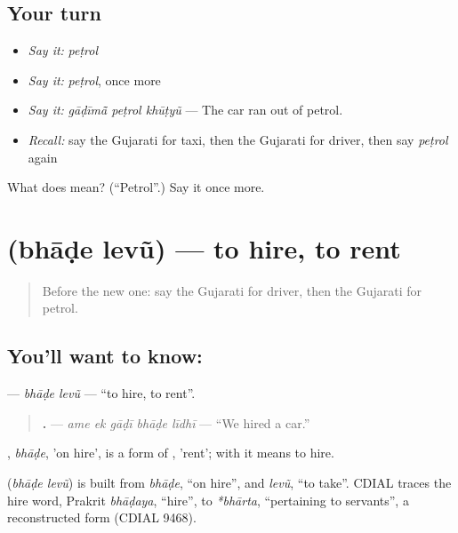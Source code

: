\subsection*{Your turn}
\begin{itemize}
\raggedright
  \item \emph{Say it:} \emph{peṭrol}
  \item \emph{Say it:} \emph{peṭrol}, once more
  \item \emph{Say it:} \emph{gāḍīmā̃ peṭrol khūṭyũ} — The car ran out of petrol.
  \item \emph{Recall:} say the Gujarati for taxi, then the Gujarati for driver, then say \emph{peṭrol} again
\end{itemize}

\begin{tcolorbox}[breakable,colback=teal!4,colframe=teal!35!black,title={Before you move on}]
What does  mean? (\textquotedblleft{}Petrol\textquotedblright{}.) Say it once more.
\end{tcolorbox}
\section[\texorpdfstring{\gu{ભાડે} \gu{લેવું} (bhāḍe levũ)}{ભાડે લેવું (bhāḍe levũ)}]{  (bhāḍe levũ) — to hire, to rent}

\label{lesson:GU-C207-bhade-levu}



\begin{quote}
Before the new one: say the Gujarati for driver, then the Gujarati for petrol.
\end{quote}

\subsection*{You'll want to know:  }
\textbf{ } — \emph{bhāḍe levũ} — \textquotedblleft{}to hire, to rent\textquotedblright{}.

\begin{quote}
\textbf{    .} — \emph{ame ek gāḍī bhāḍe līdhī} — \textquotedblleft{}We hired a car.\textquotedblright{}
\end{quote}

\textbf{}, \emph{bhāḍe}, 'on hire', is a form of \textbf{}, 'rent'; with \textbf{} it means to hire.

\begin{cousinweb}
\textbf{ } (\emph{bhāḍe levũ}) is built from \emph{bhāḍe}, \textquotedblleft{}on hire\textquotedblright{}, and \emph{levũ}, \textquotedblleft{}to take\textquotedblright{}. CDIAL traces the hire word, Prakrit \emph{bhāḍaya}, \textquotedblleft{}hire\textquotedblright{}, to \emph{*bhārta}, \textquotedblleft{}pertaining to servants\textquotedblright{}, a reconstructed form (CDIAL 9468).
\end{cousinweb}

